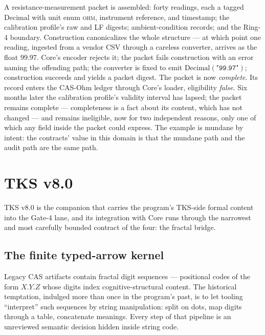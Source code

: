 \begin{example}\label{integ:ex:ohm}
A resistance-measurement packet is assembled: forty readings, each a tagged $\mathrm{Decimal}$ with unit enum \textsc{ohm}, instrument reference, and timestamp; the calibration profile's raw and LF digests; ambient-condition records; and the Ring-4 boundary. Construction canonicalizes the whole structure --- at which point one reading, ingested from a vendor CSV through a careless converter, arrives as the float $99.97$. Core's encoder rejects it; the packet fails construction with an error naming the offending path; the converter is fixed to emit $\mathrm{Decimal}(\texttt{"99.97"})$; construction succeeds and yields a packet digest. The packet is now \emph{complete}. Its record enters the CAS-Ohm ledger through Core's loader, eligibility \emph{false}. Six months later the calibration profile's validity interval has lapsed; the packet remains complete --- completeness is a fact about its content, which has not changed --- and remains ineligible, now for two independent reasons, only one of which any field inside the packet could express. The example is mundane by intent: the contracts' value in this domain is that the mundane path and the audit path are the same path.
\end{example}

\section{TKS v8.0}\label{integ:tks}

TKS v8.0 is the companion that carries the program's TKS-side formal content into the Gate-4 lane, and its integration with Core runs through the narrowest and most carefully bounded contract of the four: the fractal bridge.

\subsection{The finite typed-arrow kernel}\label{integ:tks:kernel}

Legacy CAS artifacts contain fractal digit sequences --- positional codes of the form $X.Y.Z$ whose digits index cognitive-structural content. The historical temptation, indulged more than once in the program's past, is to let tooling ``interpret'' such sequences by string manipulation: split on dots, map digits through a table, concatenate meanings. Every step of that pipeline is an unreviewed semantic decision hidden inside string code.

